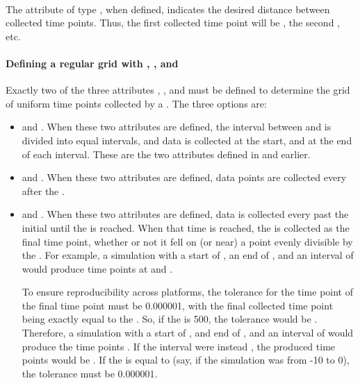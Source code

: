 \begin{blockChanged}
\paragraph*{}
\label{sec:timeInterval}
The attribute  of type , when defined, indicates the desired distance between collected time points.  Thus, the first collected time point will be , the second , etc.

\paragraph{Defining a regular grid with , , and }
Exactly two of the three attributes , , and  must be defined to determine the grid of uniform time points collected by a \UniformTimeCourse.  The three options are:

\begin{itemize} 
	\item {} and .  When these two attributes are defined, the interval between  and  is divided into  equal intervals, and data is collected at the start, and at the end of each interval.  These are the two attributes defined in \LoneVfive and earlier.
    \item {} and .  When these two attributes are defined,  data points are collected every  after the .
    \item {} and .  When these two attributes are defined, data is collected every  past the initial  until the  is reached.  When that time is reached, the  is collected as the final time point, whether or not it fell on (or near) a point evenly divisible by the .  For example, a simulation with a start of , an end of , and an interval of  would produce time points at  and .

    To ensure reproducibility across platforms, the tolerance for the time point of the final time point must be 0.000001, with the final collected time point being exactly equal to the .  So, if the  is 500, the tolerance would be .  Therefore, a simulation with a start of , and end of , and an interval of  would produce the time points \code{[0, 3.333, 6.666, 9.999, 10]}.  If the interval were instead , the produced time points would be \code{[0, 3.333333, 6.666666, 10]}.  If the  is equal to  (say, if the simulation was from -10 to 0), the tolerance must be 0.000001.


\end{itemize}
\end{blockChanged}
